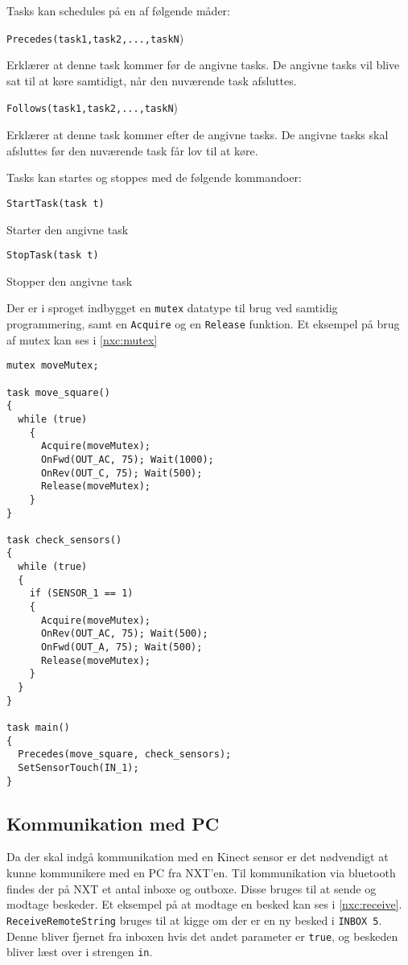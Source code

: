 Tasks kan schedules på en af følgende måder:

\begin{description}
\item{\lstinline[style=c]!Precedes(task1,task2,...,taskN!)}

Erklærer at denne task kommer før de angivne tasks. 
De angivne tasks vil blive sat til at køre samtidigt, når den nuværende task afsluttes.
\item{\lstinline[style=c]!Follows(task1,task2,...,taskN!)}

Erklærer at denne task kommer efter de angivne tasks. 
De angivne tasks skal afsluttes før den nuværende task får lov til at køre.
\end{description}

Tasks kan startes og stoppes med de følgende kommandoer:

\begin{description}
\item{\lstinline[style=c]!StartTask(task t)!}

Starter den angivne task

\item{\lstinline[style=c]!StopTask(task t)!}

Stopper den angivne task
\end{description}

Der er i sproget indbygget en \lstinline[style=c]!mutex! datatype til brug ved samtidig programmering, samt en \lstinline[style=c]!Acquire! og en \lstinline[style=c]!Release! funktion.
Et eksempel på brug af mutex kan ses i \cref{nxc:mutex}

\begin{lstlisting}[style=c,label=nxc:mutex, caption={Eksempel på brug af mutex}]
mutex moveMutex;

task move_square()
{
  while (true)
    {
      Acquire(moveMutex);
      OnFwd(OUT_AC, 75); Wait(1000);
      OnRev(OUT_C, 75); Wait(500);
      Release(moveMutex);
    }
}

task check_sensors()
{
  while (true)
  {
    if (SENSOR_1 == 1)
    {
      Acquire(moveMutex);
      OnRev(OUT_AC, 75); Wait(500);
      OnFwd(OUT_A, 75); Wait(500);
      Release(moveMutex);
    }
  }
}

task main()
{
  Precedes(move_square, check_sensors);
  SetSensorTouch(IN_1);
}
\end{lstlisting}

\subsection{Kommunikation med PC}
Da der skal indgå kommunikation med en Kinect sensor er det nødvendigt at kunne kommunikere med en PC fra NXT'en.
Til kommunikation via bluetooth findes der på NXT et antal inboxe og outboxe. 
Disse bruges til at sende og modtage beskeder.
Et eksempel på at modtage en besked kan ses i \cref{nxc:receive}.
\lstinline[style=c]|ReceiveRemoteString| bruges til at kigge om der er en ny besked i \lstinline[style=c]!INBOX 5!.
Denne bliver fjernet fra inboxen hvis det andet parameter er \lstinline[style=c]|true|, og beskeden bliver læst over i strengen \lstinline[style=c]|in|.

